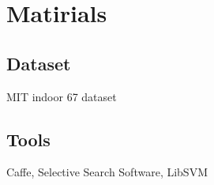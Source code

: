 \documentclass[11pt, oneside]{amsart} %
\begin{document}
\section{Matirials}
	\subsection{Dataset}
	MIT indoor 67 dataset
	\subsection{Tools}
	Caffe, Selective Search Software, LibSVM
 
 
 
 
 
 
 
 
\end{document}
